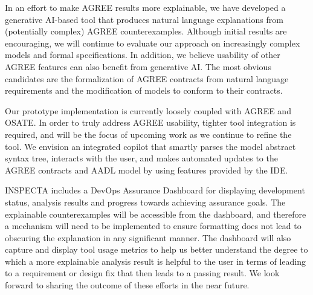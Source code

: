 
In an effort to make AGREE results more explainable, we have developed a generative AI-based tool that produces natural language explanations from (potentially complex) AGREE counterexamples. 
%
%
Although initial results are encouraging, we will continue to evaluate our approach on increasingly complex models and formal specifications.  In addition, we believe usability of other AGREE features can also benefit from generative AI.  The most obvious candidates are the formalization of AGREE contracts from natural language requirements and the modification of models to conform to their contracts.   

Our prototype implementation is currently loosely coupled with AGREE and OSATE.  In order to truly address AGREE usability, tighter tool integration is required, and will be the focus of upcoming work as we continue to refine the tool.  We envision an integrated copilot that smartly parses the model abstract syntax tree, interacts with the user, and makes automated updates to the AGREE contracts and AADL model by using features provided by the IDE.

INSPECTA includes a DevOps Assurance Dashboard for displaying development status, analysis results and progress towards achieving assurance goals.  The explainable counterexamples will be accessible from the dashboard, and therefore a mechanism will need to be implemented to ensure formatting does not lead to obscuring the explanation in any significant manner.
The dashboard will also capture and display tool usage metrics to help us better understand the degree to which a more explainable analysis result is helpful to the user in terms of leading to a requirement or design fix that then leads to a passing result. 
%
We look forward to sharing the outcome of these efforts in the near future.